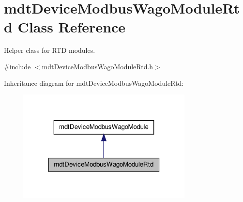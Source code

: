 \hypertarget{classmdt_device_modbus_wago_module_rtd}{
\section{mdtDeviceModbusWagoModuleRtd Class Reference}
\label{classmdt_device_modbus_wago_module_rtd}
}


Helper class for RTD modules.  




{\ttfamily \#include $<$mdtDeviceModbusWagoModuleRtd.h$>$}



Inheritance diagram for mdtDeviceModbusWagoModuleRtd:\nopagebreak
\begin{figure}[H]
\begin{center}
\leavevmode
\includegraphics[width=250pt]{classmdt_device_modbus_wago_module_rtd__inherit__graph}
\end{center}
\end{figure}


